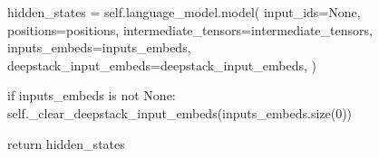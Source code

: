 \begin{CodeBlock}
    hidden_states = self.language_model.model(
        input_ids=None,
        positions=positions,
        intermediate_tensors=intermediate_tensors,
        inputs_embeds=inputs_embeds,
        deepstack_input_embeds=deepstack_input_embeds,
    )

    if inputs_embeds is not None:
        self._clear_deepstack_input_embeds(inputs_embeds.size(0))

    return hidden_states
\end{CodeBlock}
